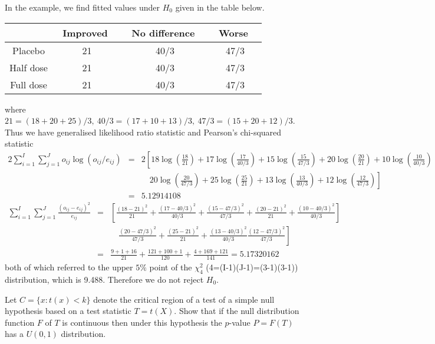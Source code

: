 In the example, we find fitted values under $H_0$ given in the table below.
\begin{center}
\begin{tabular}{cccc}
 & \ Improved \  & \ No difference \  & \ Worse \ \\ \hline
Placebo & 21  & 40/3 & 47/3  \\
Half dose & 21  & 40/3 & 47/3 \\
Full dose & 21  & 40/3 & 47/3
\end{tabular}
\end{center}
where $21=(18+20+25)/3,\ 40/3=(17+10+13)/3,\ 47/3=(15+20+12)/3$. Thus we have generalised likelihood ratio statistic and Pearson's chi-squared statistic
\begin{eqnarray}
2\sum^I_{i=1}\sum^J_{j=1}o_{ij}\log(o_{ij}/e_{ij}) & = & 2\left[18\log\left(\frac{18}{21}\right) + 17\log\left(\frac{17}{40/3}\right) + 15\log\left(\frac{15}{47/3}\right) + 20\log\left(\frac{20}{21}\right) + 10\log\left(\frac{10}{40/3}\right)\right. \nonumber\\
& & \quad \left. 20\log\left(\frac{20}{47/3}\right) + 25\log\left(\frac{25}{21}\right) + 13\log\left(\frac{13}{40/3}\right)+ 12\log\left(\frac{12}{47/3}\right)\right] \nonumber\\
& = & 5.12914108
\end{eqnarray}
\begin{eqnarray}
\sum^I_{i=1}\sum^J_{j=1}\frac{(o_{ij}-e_{ij})^2}{e_{ij}} & = & \left[\frac{(18-21)^2}{21} + \frac{(17-40/3)^2}{40/3} + \frac{(15-47/3)^2}{47/3} + \frac{(20-21)^2}{21} + \frac{(10-40/3)^2}{40/3} \right]\nonumber\\
& & \quad \left. \frac{(20-47/3)^2}{47/3} + \frac{(25-21)^2}{21} + \frac{(13-40/3)^2}{40/3}  \frac{(12-47/3)^2}{47/3}  \right] \nonumber\\
& = & \frac{9+1+16}{21} + \frac{121+100+1}{120} + \frac{4+169+121}{141} = 5.17320162
\end{eqnarray}
both of which referred to the upper $5\%$ point of the $\chi^2_4$ (4=(I-1)(J-1)=(3-1)(3-1)) distribution, which is 9.488. Therefore we do not reject $H_0$.





\item Let $C=\{x:t(x)<k\}$ denote the critical region of a test of a simple null hypothesis based on a test statistic $T=t(X)$. Show that if the null distribution function $F$ of $T$ is continuous then under this hypothesis the $p$-value $P=F(T)$ has a $U(0,1)$ distribution.

